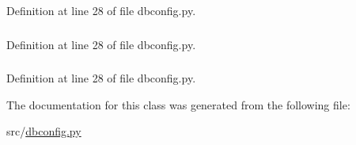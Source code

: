 Definition at line 28 of file dbconfig.py.

\hypertarget{classdbconfig_1_1Asas_af0b83fddb33f1e798d3cddf763152d87}{
\subsubsection[{plctname}]{}}
\label{classdbconfig_1_1Asas_af0b83fddb33f1e798d3cddf763152d87}


Definition at line 28 of file dbconfig.py.

\hypertarget{classdbconfig_1_1Asas_aa821e57805b77ad50a15f22e06071bd8}{
\subsubsection[{plctypes}]{}}
\label{classdbconfig_1_1Asas_aa821e57805b77ad50a15f22e06071bd8}


Definition at line 28 of file dbconfig.py.



The documentation for this class was generated from the following file:\begin{DoxyCompactItemize}
\item 
src/\hyperlink{dbconfig_8py}{dbconfig.py}\end{DoxyCompactItemize}
